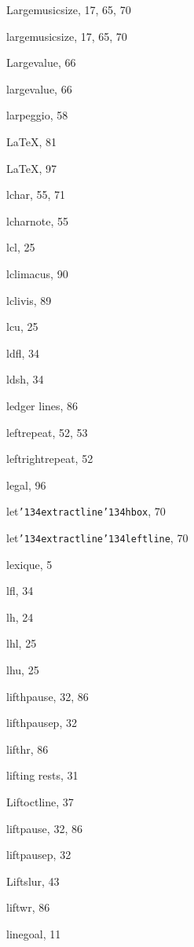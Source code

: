 \begin{theindex}
  \indexspace

  \item {\Bslash Largemusicsize}, 17, 65, 70
  \item {\Bslash largemusicsize}, 17, 65, 70
  \item {\Bslash Largevalue}, 66
  \item {\Bslash largevalue}, 66
  \item {\Bslash larpeggio}, 58
  \item \LaTeX, 81
  \item \protect\LaTeX, 97
  \item {\Bslash lchar}, 55, 71
  \item {\Bslash lcharnote}, 55
  \item {\Bslash lcl}, 25
  \item {\Bslash lclimacus}, 90
  \item {\Bslash lclivis}, 89
  \item {\Bslash lcu}, 25
  \item {\Bslash ldfl}, 34
  \item {\Bslash ldsh}, 34
  \item ledger lines, 86
  \item {\Bslash leftrepeat}, 52, 53
  \item {\Bslash leftrightrepeat}, 52
  \item legal, 96
  \item {\Bslash let\tt  \char '134extractline\tt  \char '134hbox}, 70
  \item {\Bslash let\tt  \char '134extractline\tt  \char '134leftline}, 
		70
  \item lexique, 5
  \item {\Bslash lfl}, 34
  \item {\Bslash lh}, 24
  \item {\Bslash lhl}, 25
  \item {\Bslash lhu}, 25
  \item {\Bslash lifthpause}, 32, 86
  \item {\Bslash lifthpausep}, 32
  \item {\Bslash lifthr}, 86
  \item lifting rests, 31
  \item {\Bslash Liftoctline}, 37
  \item {\Bslash liftpause}, 32, 86
  \item {\Bslash liftpausep}, 32
  \item {\Bslash Liftslur}, 43
  \item {\Bslash liftwr}, 86
  \item {\Bslash linegoal}, 11

\end{theindex}
